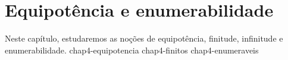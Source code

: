 \chapter{Equipotência e enumerabilidade}\label{chap:equipotenciaEEnumerabilidade}
Neste capítulo, estudaremos as noções de equipotência, finitude, infinitude e enumerabilidade.
{chap4-equipotencia}
{chap4-finitos}
{chap4-enumeraveis}

